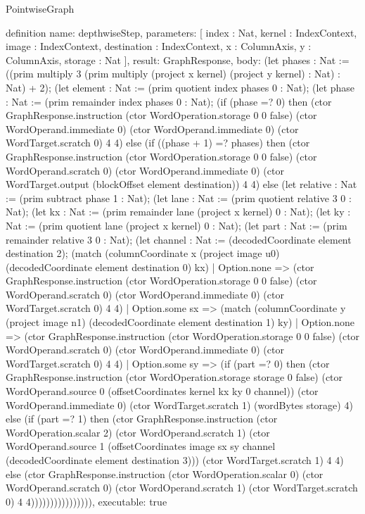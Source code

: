 \begin{lexlean}{PointwiseGraph}
\begin{semanticmodule}
definition{
  name: depthwiseStep,
  parameters: [
    index : Nat,
    kernel : IndexContext,
    image : IndexContext,
    destination : IndexContext,
    x : ColumnAxis,
    y : ColumnAxis,
    storage : Nat
  ],
  result: GraphResponse,
  body: (let phases : Nat := ((prim multiply 3 (prim multiply (project x kernel) (project y kernel) : Nat) : Nat) + 2); (let element : Nat := (prim quotient index phases 0 : Nat); (let phase : Nat := (prim remainder index phases 0 : Nat); (if (phase =? 0) then (ctor GraphResponse.instruction (ctor WordOperation.storage 0 0 false) (ctor WordOperand.immediate 0) (ctor WordOperand.immediate 0) (ctor WordTarget.scratch 0) 4 4) else (if ((phase + 1) =? phases) then (ctor GraphResponse.instruction (ctor WordOperation.storage 0 0 false) (ctor WordOperand.scratch 0) (ctor WordOperand.immediate 0) (ctor WordTarget.output (blockOffset element destination)) 4 4) else (let relative : Nat := (prim subtract phase 1 : Nat); (let lane : Nat := (prim quotient relative 3 0 : Nat); (let kx : Nat := (prim remainder lane (project x kernel) 0 : Nat); (let ky : Nat := (prim quotient lane (project x kernel) 0 : Nat); (let part : Nat := (prim remainder relative 3 0 : Nat); (let channel : Nat := (decodedCoordinate element destination 2); (match (columnCoordinate x (project image u0) (decodedCoordinate element destination 0) kx)
    | Option.none => (ctor GraphResponse.instruction (ctor WordOperation.storage 0 0 false) (ctor WordOperand.scratch 0) (ctor WordOperand.immediate 0) (ctor WordTarget.scratch 0) 4 4)
    | Option.some sx => (match (columnCoordinate y (project image n1) (decodedCoordinate element destination 1) ky)
      | Option.none => (ctor GraphResponse.instruction (ctor WordOperation.storage 0 0 false) (ctor WordOperand.scratch 0) (ctor WordOperand.immediate 0) (ctor WordTarget.scratch 0) 4 4)
      | Option.some sy => (if (part =? 0) then (ctor GraphResponse.instruction (ctor WordOperation.storage storage 0 false) (ctor WordOperand.source 0 (offsetCoordinates kernel kx ky 0 channel)) (ctor WordOperand.immediate 0) (ctor WordTarget.scratch 1) (wordBytes storage) 4) else (if (part =? 1) then (ctor GraphResponse.instruction (ctor WordOperation.scalar 2) (ctor WordOperand.scratch 1) (ctor WordOperand.source 1 (offsetCoordinates image sx sy channel (decodedCoordinate element destination 3))) (ctor WordTarget.scratch 1) 4 4) else (ctor GraphResponse.instruction (ctor WordOperation.scalar 0) (ctor WordOperand.scratch 0) (ctor WordOperand.scratch 1) (ctor WordTarget.scratch 0) 4 4)))))))))))))))),
  executable: true
}


\end{semanticmodule}
\end{lexlean}
